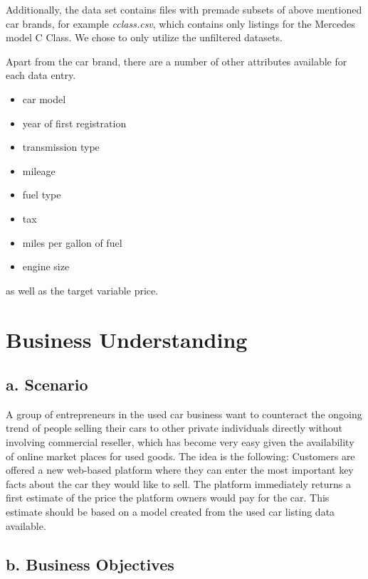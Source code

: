 \documentclass[sigchi]{acmart}
\def\tightlist{}
\begin{document}
Additionally, the data set contains files with premade subsets of above mentioned car brands, for example \emph{cclass.csv}, which contains only listings for the Mercedes model C Class. We chose to only utilize the unfiltered datasets.

Apart from the car brand, there are a number of other attributes available for each data entry.

\begin{itemize}
\tightlist
\item
  car model
\item
  year of first registration
\item
  transmission type
\item
  mileage
\item
  fuel type
\item
  tax
\item
  miles per gallon of fuel
\item
  engine size
\end{itemize}

as well as the target variable price.

\hypertarget{business-understanding}{%
\section{Business Understanding}\label{business-understanding}}

\hypertarget{a.-scenario}{%
\subsection{a. Scenario}\label{a.-scenario}}

A group of entrepreneurs in the used car business want to counteract the ongoing trend of people selling their cars to other private individuals directly without involving commercial reseller, which has become very easy given the availability of online market places for used goods. The idea is the following: Customers are offered a new web-based platform where they can enter the most important key facts about the car they would like to sell. The platform immediately returns a first estimate of the price the platform owners would pay for the car. This estimate should be based on a model created from the used car listing data available.

\hypertarget{b.-business-objectives}{%
\subsection{b. Business Objectives}\label{b.-business-objectives}}
\end{document}
